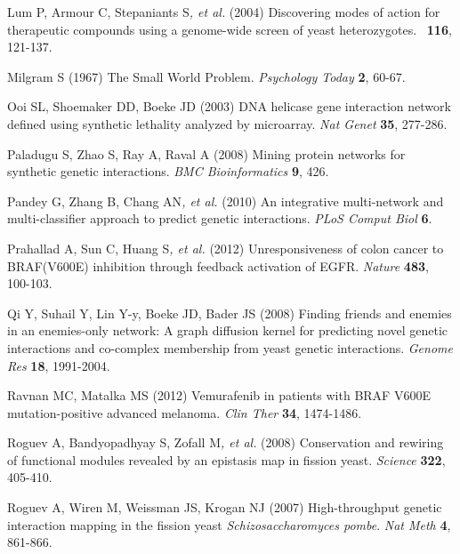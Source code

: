 Lum P, Armour C, Stepaniants S\textit{, et al.} (2004) Discovering modes
of action for therapeutic compounds using a genome-wide screen of yeast
heterozygotes. \ \textbf{116}, 121-137.



Milgram S (1967) The Small World Problem. \textit{Psychology Today}
\textbf{2}, 60-67.



Ooi SL, Shoemaker DD, Boeke JD (2003) DNA helicase gene interaction
network defined using synthetic lethality analyzed by microarray.
\textit{Nat Genet} \textbf{35}, 277-286.



\hypertarget{ENREF78}{}Paladugu S, Zhao S, Ray A, Raval A (2008) Mining
protein networks for synthetic genetic interactions. \textit{BMC
Bioinformatics} \textbf{9}, 426.



\hypertarget{ENREF79}{}Pandey G, Zhang B, Chang AN\textit{, et al.}
(2010) An integrative multi-network and multi-classifier approach to
predict genetic interactions. \textit{PLoS Comput Biol} \textbf{6}.



\hypertarget{ENREF80}{}Prahallad A, Sun C, Huang S\textit{, et al.}
(2012) Unresponsiveness of colon cancer to BRAF(V600E) inhibition
through feedback activation of EGFR. \textit{Nature} \textbf{483},
100-103.



\hypertarget{ENREF81}{}Qi Y, Suhail Y, Lin Y-y, Boeke JD, Bader JS
(2008) Finding friends and enemies in an enemies-only network: A graph
diffusion kernel for predicting novel genetic interactions and
co-complex membership from yeast genetic interactions. \textit{Genome
Res} \textbf{18}, 1991-2004.



\hypertarget{ENREF82}{}Ravnan MC, Matalka MS (2012) Vemurafenib in
patients with BRAF V600E mutation-positive advanced melanoma.
\textit{Clin Ther} \textbf{34}, 1474-1486.



Roguev A, Bandyopadhyay S, Zofall M\textit{, et al.} (2008) Conservation
and rewiring of functional modules revealed by an epistasis map in
fission yeast. \textit{Science} \textbf{322}, 405-410.



Roguev A, Wiren M, Weissman JS, Krogan NJ (2007) High-throughput genetic
interaction mapping in the fission yeast \textit{Schizosaccharomyces
pombe}. \textit{Nat Meth} \textbf{4}, 861-866.



